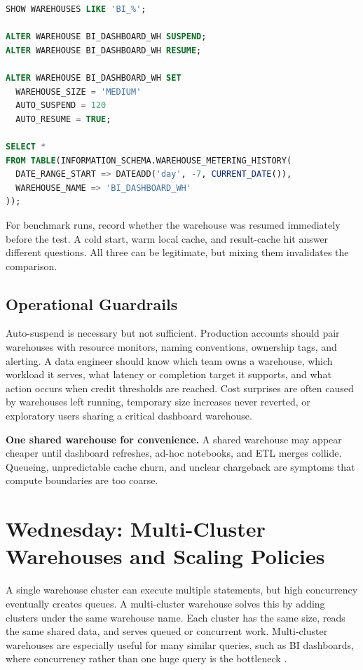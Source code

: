 \begin{lstlisting}[language=SQL,caption={Common warehouse state management commands for operations and benchmarking.},label={lst:chapter2-state-management-sql}]
SHOW WAREHOUSES LIKE 'BI_%';

ALTER WAREHOUSE BI_DASHBOARD_WH SUSPEND;
ALTER WAREHOUSE BI_DASHBOARD_WH RESUME;

ALTER WAREHOUSE BI_DASHBOARD_WH SET
  WAREHOUSE_SIZE = 'MEDIUM'
  AUTO_SUSPEND = 120
  AUTO_RESUME = TRUE;

SELECT *
FROM TABLE(INFORMATION_SCHEMA.WAREHOUSE_METERING_HISTORY(
  DATE_RANGE_START => DATEADD('day', -7, CURRENT_DATE()),
  WAREHOUSE_NAME => 'BI_DASHBOARD_WH'
));
\end{lstlisting}

\begin{tipbox}
For benchmark runs, record whether the warehouse was resumed immediately before the test. A cold start, warm local cache, and result-cache hit answer different questions. All three can be legitimate, but mixing them invalidates the comparison.
\end{tipbox}

\subsection{Operational Guardrails}
Auto-suspend is necessary but not sufficient. Production accounts should pair warehouses with resource monitors, naming conventions, ownership tags, and alerting. A data engineer should know which team owns a warehouse, which workload it serves, what latency or completion target it supports, and what action occurs when credit thresholds are reached. Cost surprises are often caused by warehouses left running, temporary size increases never reverted, or exploratory users sharing a critical dashboard warehouse.

\begin{pitfall}
\textbf{One shared warehouse for convenience.} A shared warehouse may appear cheaper until dashboard refreshes, ad-hoc notebooks, and ETL merges collide. Queueing, unpredictable cache churn, and unclear chargeback are symptoms that compute boundaries are too coarse.
\end{pitfall}

\section{Wednesday: Multi-Cluster Warehouses and Scaling Policies}
A single warehouse cluster can execute multiple statements, but high concurrency eventually creates queues. A multi-cluster warehouse solves this by adding clusters under the same warehouse name. Each cluster has the same size, reads the same shared data, and serves queued or concurrent work. Multi-cluster warehouses are especially useful for many similar queries, such as BI dashboards, where concurrency rather than one huge query is the bottleneck \cite{snowflakeMultiClusterDocs}.

